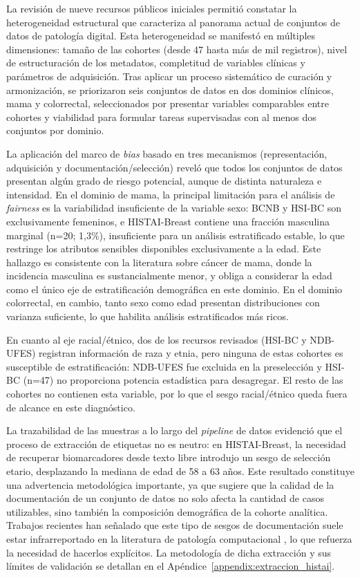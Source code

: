 La revisión de nueve recursos públicos iniciales permitió constatar la heterogeneidad estructural que caracteriza al panorama actual de conjuntos de datos de patología digital. Esta heterogeneidad se manifestó en múltiples dimensiones: tamaño de las cohortes (desde 47 hasta más de mil registros), nivel de estructuración de los metadatos, completitud de variables clínicas y parámetros de adquisición. Tras aplicar un proceso sistemático de curación y armonización, se priorizaron seis conjuntos de datos en dos dominios clínicos, mama y colorrectal, seleccionados por presentar variables comparables entre cohortes y viabilidad para formular tareas supervisadas con al menos dos conjuntos por dominio.

La aplicación del marco de \textit{bias} basado en tres mecanismos (representación, adquisición y documentación/selección) reveló que todos los conjuntos de datos presentan algún grado de riesgo potencial, aunque de distinta naturaleza e intensidad. En el dominio de mama, la principal limitación para el análisis de \textit{fairness} es la variabilidad insuficiente de la variable sexo: BCNB y HSI-BC son exclusivamente femeninos, e HISTAI-Breast contiene una fracción masculina marginal (n=20; 1,3\%), insuficiente para un análisis estratificado estable, lo que restringe los atributos sensibles disponibles exclusivamente a la edad. Este hallazgo es consistente con la literatura sobre cáncer de mama, donde la incidencia masculina es sustancialmente menor, y obliga a considerar la edad como el único eje de estratificación demográfica en este dominio. En el dominio colorrectal, en cambio, tanto sexo como edad presentan distribuciones con varianza suficiente, lo que habilita análisis estratificados más ricos.

En cuanto al eje racial/étnico, dos de los recursos revisados (HSI-BC y NDB-UFES) registran información de raza y etnia, pero ninguna de estas cohortes es susceptible de estratificación: NDB-UFES fue excluida en la preselección y HSI-BC (n=47) no proporciona potencia estadística para desagregar. El resto de las cohortes no contienen esta variable, por lo que el sesgo racial/étnico queda fuera de alcance en este diagnóstico.

La trazabilidad de las muestras a lo largo del \textit{pipeline} de datos evidenció que el proceso de extracción de etiquetas no es neutro: en HISTAI-Breast, la necesidad de recuperar biomarcadores desde texto libre introdujo un sesgo de selección etario, desplazando la mediana de edad de 58 a 63 años. Este resultado constituye una advertencia metodológica importante, ya que sugiere que la calidad de la documentación de un conjunto de datos no solo afecta la cantidad de casos utilizables, sino también la composición demográfica de la cohorte analítica. Trabajos recientes han señalado que este tipo de sesgos de documentación suele estar infrarreportado en la literatura de patología computacional \parencite{galanty2024}, lo que refuerza la necesidad de hacerlos explícitos. La metodología de dicha extracción y sus límites de validación se detallan en el Apéndice~\ref{appendix:extraccion_histai}.

